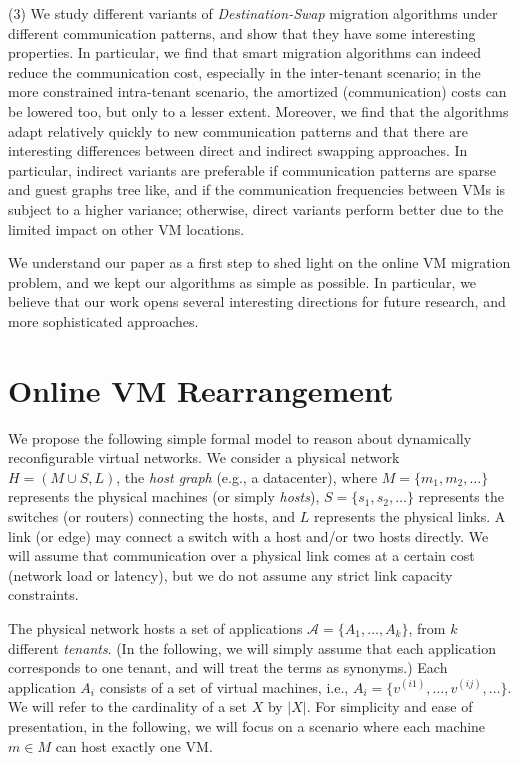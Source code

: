 \documentclass[conference]{IEEEtran}
\def\abs#1{\lvert #1 \rvert}
\begin{document}
\noindent (3) We study different variants of \emph{Destination-Swap} migration algorithms under different communication patterns, and
show that they have some interesting properties. In particular, we find that
smart migration algorithms can indeed reduce the communication cost, especially in the inter-tenant
scenario; in the more constrained intra-tenant scenario, the amortized (communication) costs
can be lowered too, but only to a lesser extent. Moreover, we find that the algorithms adapt
relatively quickly to new communication patterns and that there are interesting
differences between direct and indirect swapping approaches. In particular, indirect variants are preferable
if communication patterns are sparse and guest graphs tree like, and if the communication
frequencies between VMs is subject to a higher variance; otherwise, direct variants perform better
due to the limited impact on other VM locations.

We understand our paper as a first step to shed light on the online VM migration problem,
and we kept our algorithms as simple as possible. In particular, we believe that our work
opens several interesting directions for future research, and more sophisticated approaches.



\section{Online VM Rearrangement}\label{sec:model}

We propose the following simple formal model to reason about dynamically reconfigurable virtual networks.
We consider a physical network $H=(M \cup S,L)$, the \emph{host graph} (e.g., a datacenter), where $M=\{m_1, m_2, \dots\}$ represents the physical machines (or simply \emph{hosts}),
$S= \{s_1, s_2, \dots\}$ represents the switches (or routers) connecting the hosts, and $L$ represents the physical links. A link (or edge) may connect a switch with a host and/or two hosts directly. We will assume that communication over a physical link comes at a certain cost (network load or latency), but we do not assume any strict link capacity constraints.

The physical network hosts a set of applications $\mathcal{A}=\{A_1,\ldots,A_k\}$, from $k$ different \emph{tenants}. (In the following, we will
simply assume that each application corresponds to one tenant, and will treat the terms as synonyms.) Each application $A_i$
consists of a set of virtual machines, i.e., $A_i=\{v^{(i1)},\ldots,v^{(ij)}, \dots \}$. We will refer to the cardinality of a set $X$ by $\abs{X}$.
For simplicity and ease of presentation,
in the following, we will focus on a scenario where each machine $m \in M$ can host exactly
one VM.
\end{document}
